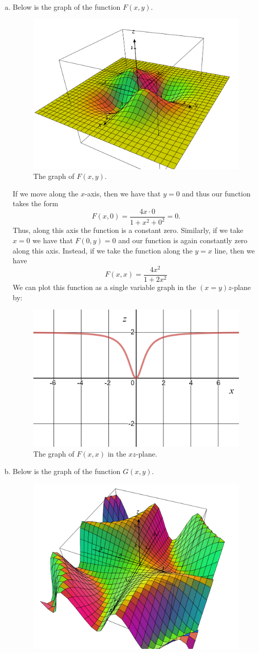 \documentclass[12pt]{article} %
\begin{document}
\begin{solution}~
\begin{enumerate}[(a)]
    \item Below is the graph of the function $F(x,y)$.
    \begin{figure}[H]
        \centering
        \includegraphics[width=.6\textwidth]{Images/4a.png}
        \caption{The graph of $F(x,y)$.}
    \end{figure}
    If we move along the $x$-axis, then we have that $y=0$ and thus our function takes the form
    \[
    F(x,0) = \frac{4x\cdot 0}{1+x^2+0^2} = 0.
    \]
    Thus, along this axis the function is a constant zero. Similarly, if we take $x=0$ we have that $F(0,y)=0$ and our function is again constantly zero along this axis. Instead, if we take the function along the $y=x$ line, then we have
    \[
    F(x,x) = \frac{4x^2}{1+2x^2}
    \]
    We can plot this function as a single variable graph in the $(x=y)z$-plane by:
    \begin{figure}[H]
    	\centering
    	\includegraphics[width=.6\textwidth]{Images/3a_y=x.png}
    	\caption{The graph of $F(x,x)$ in the $xz$-plane.}
    \end{figure}
    \item Below is the graph of the function $G(x,y)$.
    \begin{figure}[H]
        \centering
        \includegraphics[width=.6\textwidth]{Images/4b.png}

\end{figure}
\end{enumerate}
\end{solution}
\end{document}
